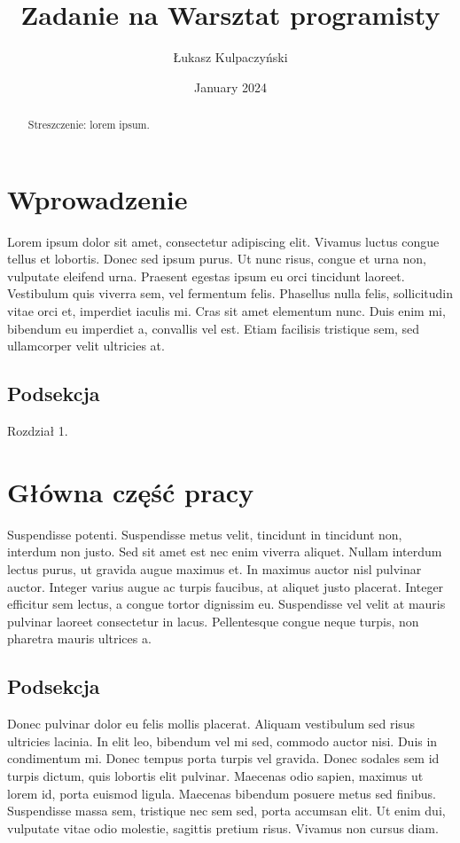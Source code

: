 \documentclass{article}
\title{Zadanie na Warsztat programisty}
\author{Łukasz Kulpaczyński}
\date{January 2024}
\begin{document}
\maketitle %

\begin{abstract}
Streszczenie: lorem ipsum.
\end{abstract}

\tableofcontents %
\newpage

\section{Wprowadzenie}
Lorem ipsum \cite{hawking1974} dolor sit amet, consectetur adipiscing elit. Vivamus luctus congue tellus et lobortis. Donec sed ipsum purus. Ut nunc risus, congue et urna non, vulputate eleifend urna. Praesent egestas ipsum eu orci tincidunt laoreet. Vestibulum quis viverra sem, \cite{shannon1948} vel fermentum felis. Phasellus nulla felis, sollicitudin vitae orci et, imperdiet iaculis mi. Cras sit amet elementum nunc. Duis enim mi, bibendum eu imperdiet a, convallis vel est. Etiam facilisis tristique sem, sed ullamcorper velit ultricies at.
\subsection{Podsekcja}
Rozdział 1.

\section{Główna część pracy}
Suspendisse potenti.\cite{knuth1984} Suspendisse metus velit, tincidunt in tincidunt non, interdum non justo. Sed sit amet est nec enim viverra aliquet. Nullam interdum lectus purus, ut gravida augue maximus et. In maximus auctor nisl pulvinar auctor. Integer varius augue ac turpis faucibus, at aliquet justo placerat. Integer efficitur sem lectus, a congue tortor dignissim eu. Suspendisse vel velit at mauris pulvinar laoreet consectetur in lacus. Pellentesque congue neque turpis, non pharetra mauris ultrices a.\cite{mccarthy1960}

\subsection{Podsekcja}
Donec pulvinar dolor eu felis mollis placerat. Aliquam vestibulum sed risus ultricies lacinia. In elit leo, bibendum vel mi sed, commodo auctor nisi. Duis in condimentum mi. Donec tempus porta turpis vel gravida. Donec sodales sem id turpis dictum, quis lobortis elit pulvinar. \cite{turing1936}Maecenas odio sapien, maximus ut lorem id, porta euismod ligula. Maecenas bibendum posuere metus sed finibus. Suspendisse massa sem, tristique nec sem sed, porta accumsan elit. Ut enim dui, vulputate vitae odio molestie, sagittis pretium risus. Vivamus non cursus diam.
\end{document}
